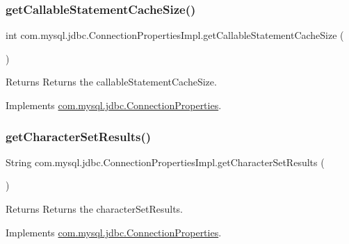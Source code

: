 \subsubsection{\texorpdfstring{get\+Callable\+Statement\+Cache\+Size()}{getCallableStatementCacheSize()}}
{\footnotesize\ttfamily int com.\+mysql.\+jdbc.\+Connection\+Properties\+Impl.\+get\+Callable\+Statement\+Cache\+Size (\begin{DoxyParamCaption}{ }\end{DoxyParamCaption})}

\begin{DoxyReturn}{Returns}
Returns the callable\+Statement\+Cache\+Size. 
\end{DoxyReturn}


Implements \mbox{\hyperlink{interfacecom_1_1mysql_1_1jdbc_1_1_connection_properties_a413ae8156c79a09e68023792a88351ac}{com.\+mysql.\+jdbc.\+Connection\+Properties}}.

\mbox{\label{classcom_1_1mysql_1_1jdbc_1_1_connection_properties_impl_a4f02882c0eca15cce4f9bf4dbd496701}} 
\subsubsection{\texorpdfstring{get\+Character\+Set\+Results()}{getCharacterSetResults()}}
{\footnotesize\ttfamily String com.\+mysql.\+jdbc.\+Connection\+Properties\+Impl.\+get\+Character\+Set\+Results (\begin{DoxyParamCaption}{ }\end{DoxyParamCaption})}

\begin{DoxyReturn}{Returns}
Returns the character\+Set\+Results. 
\end{DoxyReturn}


Implements \mbox{\hyperlink{interfacecom_1_1mysql_1_1jdbc_1_1_connection_properties_a64a9d2f56ed041326aa829a7f665747a}{com.\+mysql.\+jdbc.\+Connection\+Properties}}.

\mbox{\label{classcom_1_1mysql_1_1jdbc_1_1_connection_properties_impl_a1b466ed0206073ffd62f5aa41ce6acfd}} 
